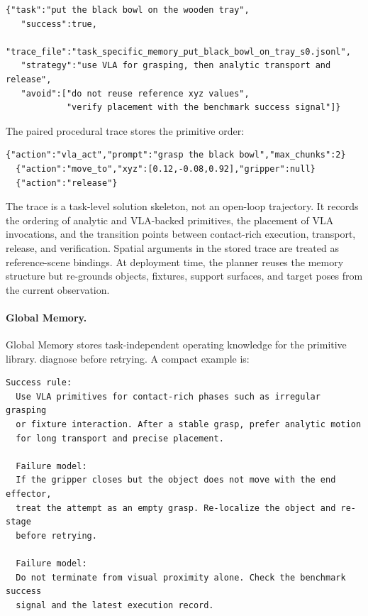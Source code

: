 \documentclass{article}
\begin{document}
  \begin{samepage}
  \begin{lstlisting}[frame=single,framerule=0.5pt]
  {"task":"put the black bowl on the wooden tray",
   "success":true,
   "trace_file":"task_specific_memory_put_black_bowl_on_tray_s0.jsonl",
   "strategy":"use VLA for grasping, then analytic transport and release",
   "avoid":["do not reuse reference xyz values",
            "verify placement with the benchmark success signal"]}
  \end{lstlisting}
  \end{samepage}

  The paired procedural trace stores the primitive order:

  \begin{samepage}
  \begin{lstlisting}[frame=single,framerule=0.5pt]
  {"action":"vla_act","prompt":"grasp the black bowl","max_chunks":2}
  {"action":"move_to","xyz":[0.12,-0.08,0.92],"gripper":null}
  {"action":"release"}
  \end{lstlisting}
  \end{samepage}

  The trace is a task-level solution skeleton, not an open-loop trajectory. It records
  the ordering of analytic and VLA-backed primitives, the placement of VLA invocations,
  and the transition points between contact-rich execution, transport, release, and
  verification. Spatial arguments in the stored trace are treated as reference-scene
  bindings. At deployment time, the planner reuses the memory structure but re-grounds
  objects, fixtures, support surfaces, and target poses from the current observation.

  \paragraph{Global Memory.}
  Global Memory stores task-independent operating knowledge for the primitive library.
  diagnose before retrying. A compact example is:

  \begin{samepage}
  \begin{lstlisting}[frame=single,framerule=0.5pt]
  Success rule:
  Use VLA primitives for contact-rich phases such as irregular grasping
  or fixture interaction. After a stable grasp, prefer analytic motion
  for long transport and precise placement.

  Failure model:
  If the gripper closes but the object does not move with the end effector,
  treat the attempt as an empty grasp. Re-localize the object and re-stage
  before retrying.

  Failure model:
  Do not terminate from visual proximity alone. Check the benchmark success
  signal and the latest execution record.
  \end{lstlisting}
  \end{samepage}
\end{document}
